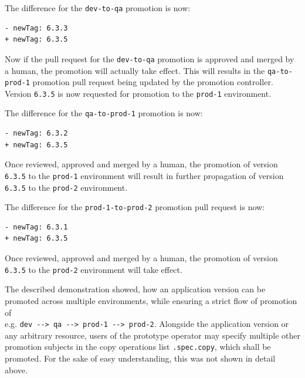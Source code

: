 The difference for the \lstinline|dev-to-qa| promotion is now:

\begin{lstlisting}
- newTag: 6.3.3
+ newTag: 6.3.5
\end{lstlisting}


Now if the pull request for the \lstinline|dev-to-qa| promotion
is approved and merged by a human,
the promotion will actually take effect.
This will results in the \lstinline|qa-to-prod-1| promotion pull request being updated
by the promotion controller.
Version \lstinline|6.3.5| is now requested for promotion to the
\lstinline|prod-1| environment.

The difference for the \lstinline|qa-to-prod-1| promotion is now:

\begin{lstlisting}
- newTag: 6.3.2
+ newTag: 6.3.5
\end{lstlisting}

Once reviewed, approved and merged by a human,
the promotion of version \lstinline|6.3.5| to the \lstinline|prod-1| environment
will result in further propagation of version \lstinline|6.3.5|
to the \lstinline|prod-2| environment.

The difference for the \lstinline|prod-1-to-prod-2| promotion pull request is now:

\begin{lstlisting}
- newTag: 6.3.1
+ newTag: 6.3.5
\end{lstlisting}

Once reviewed, approved and merged by a human,
the promotion of version \lstinline|6.3.5| to the \lstinline|prod-2| environment
will take effect.

The described demonstration showed,
how an application version can be promoted across multiple environments,
while ensuring a strict flow of promotion of \\
e.g. \lstinline|dev --> qa --> prod-1 --> prod-2|.
Alongside the application version or any arbitrary resource,
users of the prototype operator may specify multiple other
promotion subjects in the copy operations list \lstinline|.spec.copy|, which shall be promoted.
For the sake of easy understanding, this was not shown in detail above.





